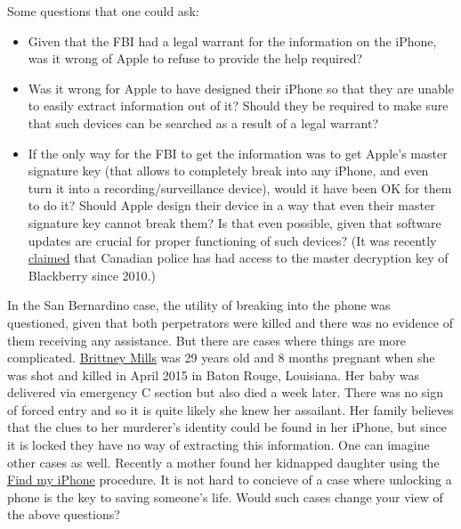 Some questions that one could ask:

\begin{itemize}
\item
  Given that the FBI had a legal warrant for the information on the
  iPhone, was it wrong of Apple to refuse to provide the help required?
\item
  Was it wrong for Apple to have designed their iPhone so that they are
  unable to easily extract information out of it? Should they be
  required to make sure that such devices can be searched as a result of
  a legal warrant?
\item
  If the only way for the FBI to get the information was to get Apple's
  master signature key (that allows to completely break into any iPhone,
  and even turn it into a recording/surveillance device), would it have
  been OK for them to do it? Should Apple design their device in a way
  that even their master signature key cannot break them? Is that even
  possible, given that software updates are crucial for proper
  functioning of such devices? (It was recently
  \href{http://www.theverge.com/2016/4/14/11434926/blackberry-encryption-master-key-broken-canada-rcmp-surveillance}{claimed}
  that Canadian police has had access to the master decryption key of
  Blackberry since 2010.)
\end{itemize}

In the San Bernardino case, the utility of breaking into the phone was
questioned, given that both perpetrators were killed and there was no
evidence of them receiving any assistance. But there are cases where
things are more complicated.
\href{http://www.npr.org/sections/alltechconsidered/2016/03/30/472302719/mom-asks-who-will-unlock-her-murdered-daughters-iphone}{Brittney
Mills} was 29 years old and 8 months pregnant when she was shot and
killed in April 2015 in Baton Rouge, Louisiana. Her baby was delivered
via emergency C section but also died a week later. There was no sign of
forced entry and so it is quite likely she knew her assailant. Her
family believes that the clues to her murderer's identity could be found
in her iPhone, but since it is locked they have no way of extracting
this information. One can imagine other cases as well. Recently a mother
found her kidnapped daughter using the
\href{http://www.nbcnews.com/news/us-news/find-my-iphone-icloud-lead-cops-kidnapped-teen-n521486}{Find
my iPhone} procedure. It is not hard to concieve of a case where
unlocking a phone is the key to saving someone's life. Would such cases
change your view of the above questions?


